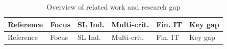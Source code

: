 \documentclass[
  12pt,
  letterpaper,
  12pt,
  oneside,
  english,
  onehalfspacing,
  headsepline]{MastersDoctoralThesis}
\begin{document}
\begin{samepage}
\scriptsize

\begin{longtable}[]{@{}
  >{\raggedright\arraybackslash}p{}
  >{\raggedright\arraybackslash}p{}
  >{\centering\arraybackslash}p{}
  >{\centering\arraybackslash}p{}
  >{\centering\arraybackslash}p{}
  >{\raggedright\arraybackslash}p{}@{}}
\caption{Overview of related work and research
gap}\label{tbl-lit-overview}\tabularnewline
\toprule\noalign{}
\begin{minipage}[b]{\linewidth}\raggedright
Reference
\end{minipage} & \begin{minipage}[b]{\linewidth}\raggedright
Focus
\end{minipage} & \begin{minipage}[b]{\linewidth}\centering
SL Ind.
\end{minipage} & \begin{minipage}[b]{\linewidth}\centering
Multi-crit.
\end{minipage} & \begin{minipage}[b]{\linewidth}\centering
Fin. IT
\end{minipage} & \begin{minipage}[b]{\linewidth}\raggedright
Key gap
\end{minipage} \\
\midrule\noalign{}
\endfirsthead
\toprule\noalign{}
\begin{minipage}[b]{\linewidth}\raggedright
Reference
\end{minipage} & \begin{minipage}[b]{\linewidth}\raggedright
Focus
\end{minipage} & \begin{minipage}[b]{\linewidth}\centering
SL Ind.
\end{minipage} & \begin{minipage}[b]{\linewidth}\centering
Multi-crit.
\end{minipage} & \begin{minipage}[b]{\linewidth}\centering
Fin. IT
\end{minipage} & \begin{minipage}[b]{\linewidth}\raggedright
Key gap
\end{minipage} \\

\end{longtable}
\end{samepage}
\end{document}
